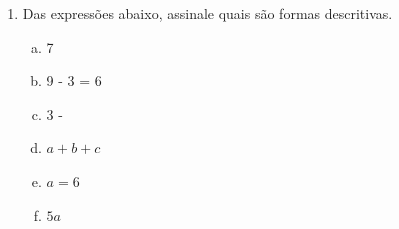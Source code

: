 \documentclass[a4paper,14pt]{article}
\begin{document}
\begin{multicols}{2}
\begin{enumerate}
			\item Das expressões abaixo, assinale quais são formas descritivas.
			\begin{enumerate}[a)]
				\item 7
				\item 9 - 3 = 6
				\item 3 -
				\item $a + b + c$
				\item $a = 6$
				\item $5a$
			\end{enumerate}
		\end{enumerate}
		$~$ \\ $~$ \\ $~$ \\ $~$ \\ $~$ \\ $~$ \\ $~$ \\ $~$ \\ $~$ \\ $~$ \\ $~$ \\ $~$ \\ $~$ \\ $~$ \\ $~$ \\ $~$ \\ $~$ \\ $~$ \\ $~$ \\ $~$ \\ $~$ \\ $~$ \\ $~$ \\ $~$ \\ $~$ \\ $~$ \\ $~$ \\ $~$ \\ $~$ \\ $~$ \\ $~$ \\ $~$ \\ $~$ \\ $~$ \\ $~$ \\ $~$ \\ $~$ \\ $~$ \\ $~$ \\ $~$ \\ $~$ \\ $~$ \\ $~$ \\ $~$ \\ 
	\end{multicols}
\end{document}

